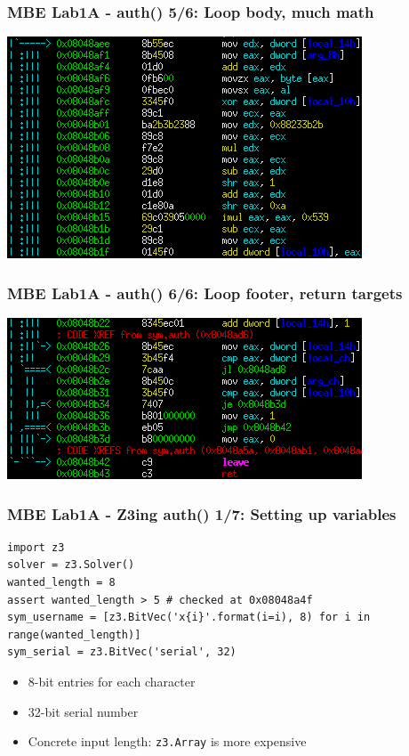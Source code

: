 \documentclass[aspectratio=169]{beamer}
\begin{document}
\begin{frame}[fragile]
\frametitle{MBE Lab1A - auth() 5/6: Loop body, much math}
\includegraphics[width=0.8\paperwidth]{pictures/intel/mbe_lab1a_auth_chunk5.png}
\end{frame}

\begin{frame}[fragile]
\frametitle{MBE Lab1A - auth() 6/6: Loop footer, return targets}
\includegraphics[width=0.9\paperwidth]{pictures/intel/mbe_lab1a_auth_chunk6.png}
\end{frame}

\begin{frame}[fragile]
\frametitle{MBE Lab1A - Z3ing auth() 1/7: Setting up variables}
\begin{Verbatim}[fontsize=\scriptsize, frame=single]
import z3
solver = z3.Solver()
wanted_length = 8
assert wanted_length > 5 # checked at 0x08048a4f
sym_username = [z3.BitVec('x{i}'.format(i=i), 8) for i in range(wanted_length)]
sym_serial = z3.BitVec('serial', 32)
\end{Verbatim}
\begin{itemize}
\item 8-bit entries for each character
\item 32-bit serial number
\item Concrete input length: \verb|z3.Array| is more expensive
\end{itemize}
\end{frame}
\end{document}
